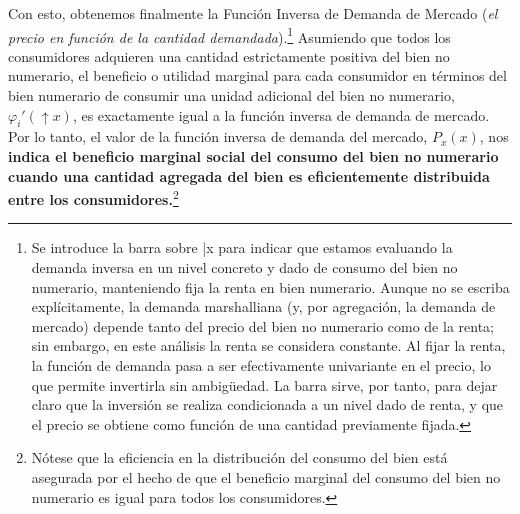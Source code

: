 \documentclass[10pt,a4paper]{article}
\begin{document}
Con esto, obtenemos finalmente la Función Inversa de Demanda de Mercado (\textit{el precio en función de la cantidad demandada}).\footnote{%
    Se introduce la barra sobre \bar x para indicar que estamos evaluando la demanda inversa en un nivel concreto y dado de consumo del bien no numerario, manteniendo fija la renta en bien numerario. Aunque no se escriba explícitamente, la demanda marshalliana (y, por agregación, la demanda de mercado) depende tanto del precio del bien no numerario como de la renta; sin embargo, en este análisis la renta se considera constante. Al fijar la renta, la función de demanda pasa a ser efectivamente univariante en el precio, lo que permite invertirla sin ambigüedad. La barra sirve, por tanto, para dejar claro que la inversión se realiza condicionada a un nivel dado de renta, y que el precio se obtiene como función de una cantidad previamente fijada.
} Asumiendo que todos los consumidores adquieren una cantidad estrictamente positiva del bien no numerario, el beneficio o utilidad marginal para cada consumidor en términos del bien numerario de consumir una unidad adicional del bien no numerario, $\varphi_i'(\uparrow x)$, es exactamente igual a la función inversa de demanda de mercado. Por lo tanto, el valor de la función inversa de demanda del mercado, $P_x(x)$, nos \textbf{indica el beneficio marginal social del consumo del bien no numerario cuando una cantidad agregada del bien es eficientemente distribuida entre los consumidores.}\footnote{%
    Nótese que la eficiencia en la distribución del consumo del bien está asegurada por el hecho de que el beneficio marginal del consumo del bien no numerario es igual para todos los consumidores.

} 
\end{document}
